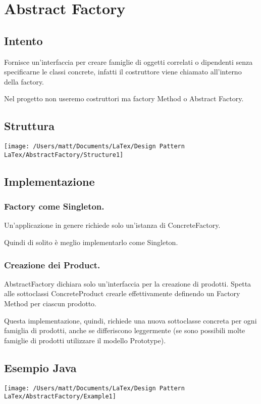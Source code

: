     \chapter{Abstract Factory}
    \section{Intento}
    
    Fornisce un'interfaccia per creare famiglie di oggetti correlati o dipendenti senza specificarne le classi concrete, infatti il costruttore viene chiamato all'interno della factory.

    Nel progetto non useremo costruttori ma factory Method o Abstract Factory.


    \section{Struttura}

    \texttt{[image: /Users/matt/Documents/LaTex/Design Pattern LaTex/AbstractFactory/Structure1]}


    \section{Implementazione}

    \subsection{Factory come Singleton.}
        Un'applicazione in genere richiede solo un'istanza di ConcreteFactory.

        Quindi di solito è meglio implementarlo come Singleton.

    \subsection{Creazione dei Product.}         
        AbstractFactory dichiara solo un'interfaccia per la creazione di prodotti. Spetta alle sottoclassi ConcreteProduct crearle effettivamente definendo un Factory Method per ciascun prodotto.
        
        Questa implementazione, quindi, richiede una nuova sottoclasse concreta per ogni famiglia di prodotti, anche se differiscono leggermente (se sono possibili molte famiglie di prodotti utilizzare il modello Prototype).
    

    \section{Esempio Java}
    \texttt{[image: /Users/matt/Documents/LaTex/Design Pattern LaTex/AbstractFactory/Example1]}

